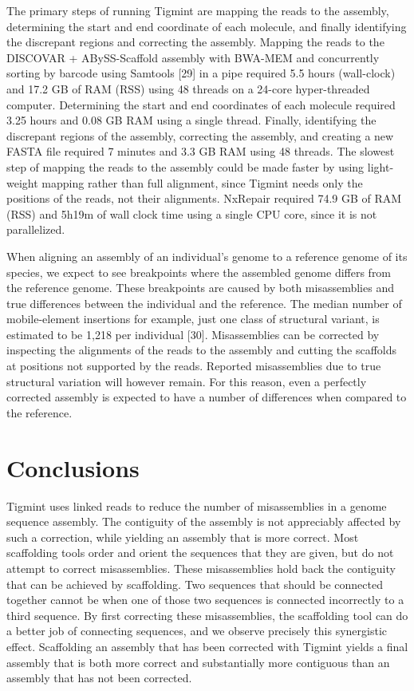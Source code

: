 \documentclass{bmcart}
\begin{document}
The primary steps of running Tigmint are mapping the reads to the assembly, determining the start and end coordinate of each molecule, and finally identifying the discrepant regions and correcting the assembly. Mapping the reads to the DISCOVAR + ABySS-Scaffold assembly with BWA-MEM and concurrently sorting by barcode using Samtools {[}29{]} in a pipe required 5.5 hours (wall-clock) and 17.2 GB of RAM (RSS) using 48 threads on a 24-core hyper-threaded computer. Determining the start and end coordinates of each molecule required 3.25 hours and 0.08 GB RAM using a single thread. Finally, identifying the discrepant regions of the assembly, correcting the assembly, and creating a new FASTA file required 7 minutes and 3.3 GB RAM using 48 threads. The slowest step of mapping the reads to the assembly could be made faster by using light-weight mapping rather than full alignment, since Tigmint needs only the positions of the reads, not their alignments. NxRepair required 74.9 GB of RAM (RSS) and 5h19m of wall clock time using a single CPU core, since it is not parallelized.

When aligning an assembly of an individual's genome to a reference genome of its species, we expect to see breakpoints where the assembled genome differs from the reference genome. These breakpoints are caused by both misassemblies and true differences between the individual and the reference. The median number of mobile-element insertions for example, just one class of structural variant, is estimated to be 1,218 per individual {[}30{]}. Misassemblies can be corrected by inspecting the alignments of the reads to the assembly and cutting the scaffolds at positions not supported by the reads. Reported misassemblies due to true structural variation will however remain. For this reason, even a perfectly corrected assembly is expected to have a number of differences when compared to the reference.

\hypertarget{conclusions}{%
\section*{Conclusions}\label{conclusions}}

Tigmint uses linked reads to reduce the number of misassemblies in a genome sequence assembly. The contiguity of the assembly is not appreciably affected by such a correction, while yielding an assembly that is more correct. Most scaffolding tools order and orient the sequences that they are given, but do not attempt to correct misassemblies. These misassemblies hold back the contiguity that can be achieved by scaffolding. Two sequences that should be connected together cannot be when one of those two sequences is connected incorrectly to a third sequence. By first correcting these misassemblies, the scaffolding tool can do a better job of connecting sequences, and we observe precisely this synergistic effect. Scaffolding an assembly that has been corrected with Tigmint yields a final assembly that is both more correct and substantially more contiguous than an assembly that has not been corrected.
\end{document}
